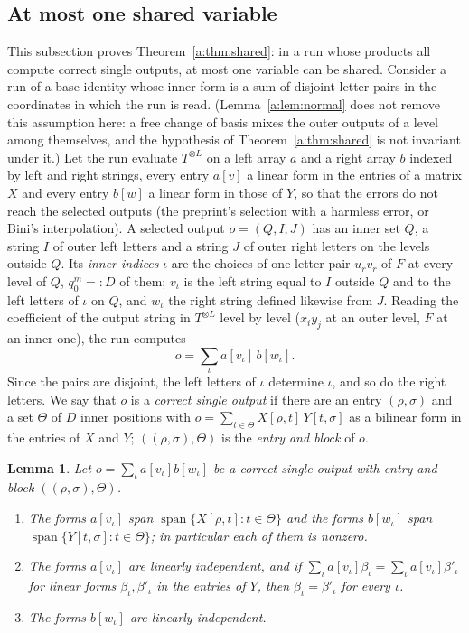 \documentclass[11pt]{article}
\newtheorem{lemma}[theorem]{Lemma}
\theoremstyle{definition}
\theoremstyle{remark}
\begin{document}
\subsection{At most one shared variable}\label{a:sec:shared}

This subsection proves Theorem~\ref{a:thm:shared}: in a run whose products all compute correct single outputs, at most one variable can be shared. Consider a run of a base identity whose inner form is a sum of disjoint letter pairs in the coordinates in which the run is read. (Lemma~\ref{a:lem:normal} does not remove this assumption here: a free change of basis mixes the outer outputs of a level among themselves, and the hypothesis of Theorem~\ref{a:thm:shared} is not invariant under it.) Let the run evaluate $T^{\otimes L}$ on a left array $a$ and a right array $b$ indexed by left and right strings, every entry $a[v]$ a linear form in the entries of a matrix $X$ and every entry $b[w]$ a linear form in those of $Y$, so that the errors do not reach the selected outputs (the preprint's selection with a harmless error, or Bini's interpolation). A selected output $o=(Q,I,J)$ has an inner set $Q$, a string $I$ of outer left letters and a string $J$ of outer right letters on the levels outside $Q$. Its \emph{inner indices} $\iota$ are the choices of one letter pair $u_rv_r$ of $F$ at every level of $Q$, $q_0^m=:D$ of them; $v_\iota$ is the left string equal to $I$ outside $Q$ and to the left letters of $\iota$ on $Q$, and $w_\iota$ the right string defined likewise from $J$. Reading the coefficient of the output string in $T^{\otimes L}$ level by level ($x_iy_j$ at an outer level, $F$ at an inner one), the run computes
\[
o=\sum_\iota a[v_\iota]\,b[w_\iota].
\]
Since the pairs are disjoint, the left letters of $\iota$ determine $\iota$, and so do the right letters. We say that $o$ is a \emph{correct single output} if there are an entry $(\rho,\sigma)$ and a set $\Theta$ of $D$ inner positions with $o=\sum_{t\in\Theta}X[\rho,t]\,Y[t,\sigma]$ as a bilinear form in the entries of $X$ and $Y$; $((\rho,\sigma),\Theta)$ is the \emph{entry and block} of $o$.

\begin{lemma}\label{a:lem:facts}
Let $o=\sum_\iota a[v_\iota]b[w_\iota]$ be a correct single output with entry and block $((\rho,\sigma),\Theta)$.
\begin{enumerate}[label=(\Alph*),nosep]
\item The forms $a[v_\iota]$ span $\operatorname{span}\{X[\rho,t]:t\in\Theta\}$ and the forms $b[w_\iota]$ span $\operatorname{span}\{Y[t,\sigma]:t\in\Theta\}$; in particular each of them is nonzero.
\item The forms $a[v_\iota]$ are linearly independent, and if $\sum_\iota a[v_\iota]\beta_\iota=\sum_\iota a[v_\iota]\beta'_\iota$ for linear forms $\beta_\iota,\beta'_\iota$ in the entries of $Y$, then $\beta_\iota=\beta'_\iota$ for every $\iota$.
\item The forms $b[w_\iota]$ are linearly independent.
\end{enumerate}
\end{lemma}
\end{document}

